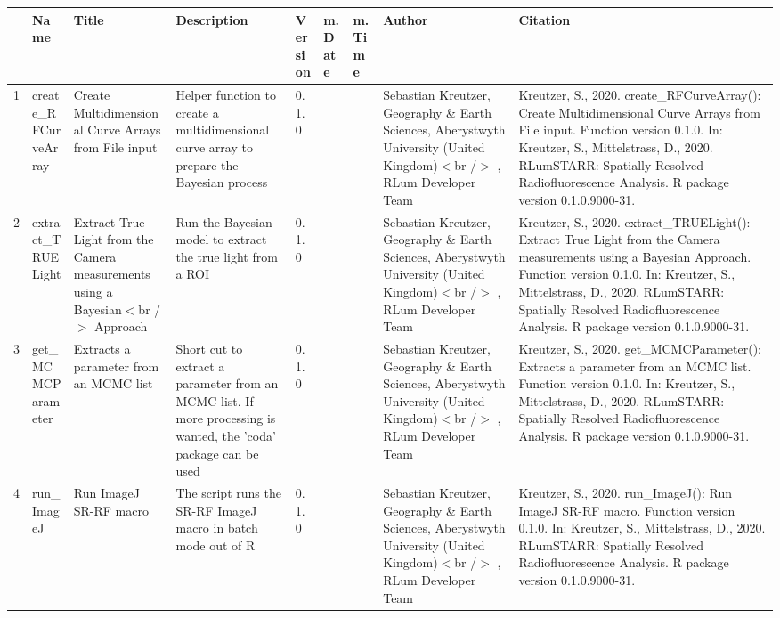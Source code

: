 \begin{table}[ht]
\centering
\begin{tabular}{rllllllll}
  \hline
 & Name & Title & Description & Version & m.Date & m.Time & Author & Citation \\ 
  \hline
1 & create\_RFCurveArray & Create Multidimensional Curve Arrays from File input & Helper function to create a multidimensional curve array to prepare the Bayesian process & 0.1.0
 &  &  & Sebastian Kreutzer, Geography \& Earth Sciences, Aberystwyth University (United Kingdom)$<$br /$>$ , RLum Developer Team & Kreutzer, S., 2020. create\_RFCurveArray(): Create Multidimensional Curve Arrays from File input. Function version 0.1.0. In: Kreutzer, S., Mittelstrass, D., 2020. RLumSTARR: Spatially Resolved Radiofluorescence Analysis. R package version 0.1.0.9000-31. 
 \\ 
  2 & extract\_TRUELight & Extract True Light from the Camera measurements using a Bayesian$<$br /$>$ Approach & Run the Bayesian model to extract the true light from a ROI & 0.1.0
 &  &  & Sebastian Kreutzer, Geography \& Earth Sciences, Aberystwyth University (United Kingdom)$<$br /$>$ , RLum Developer Team & Kreutzer, S., 2020. extract\_TRUELight(): Extract True Light from the Camera measurements using a Bayesian Approach. Function version 0.1.0. In: Kreutzer, S., Mittelstrass, D., 2020. RLumSTARR: Spatially Resolved Radiofluorescence Analysis. R package version 0.1.0.9000-31. 
 \\ 
  3 & get\_MCMCParameter & Extracts a parameter from an MCMC list & Short cut to extract a parameter from an MCMC list. If more processing is wanted, the  'coda'  package can be used & 0.1.0
 &  &  & Sebastian Kreutzer, Geography \& Earth Sciences, Aberystwyth University (United Kingdom)$<$br /$>$ , RLum Developer Team & Kreutzer, S., 2020. get\_MCMCParameter(): Extracts a parameter from an MCMC list. Function version 0.1.0. In: Kreutzer, S., Mittelstrass, D., 2020. RLumSTARR: Spatially Resolved Radiofluorescence Analysis. R package version 0.1.0.9000-31. 
 \\ 
  4 & run\_ImageJ & Run ImageJ SR-RF macro & The script runs the SR-RF ImageJ macro in batch mode out of R & 0.1.0
 &  &  & Sebastian Kreutzer, Geography \& Earth Sciences, Aberystwyth University (United Kingdom)$<$br /$>$ , RLum Developer Team & Kreutzer, S., 2020. run\_ImageJ(): Run ImageJ SR-RF macro. Function version 0.1.0. In: Kreutzer, S., Mittelstrass, D., 2020. RLumSTARR: Spatially Resolved Radiofluorescence Analysis. R package version 0.1.0.9000-31. 
 \\ 
   \hline
\end{tabular}
\end{table}

